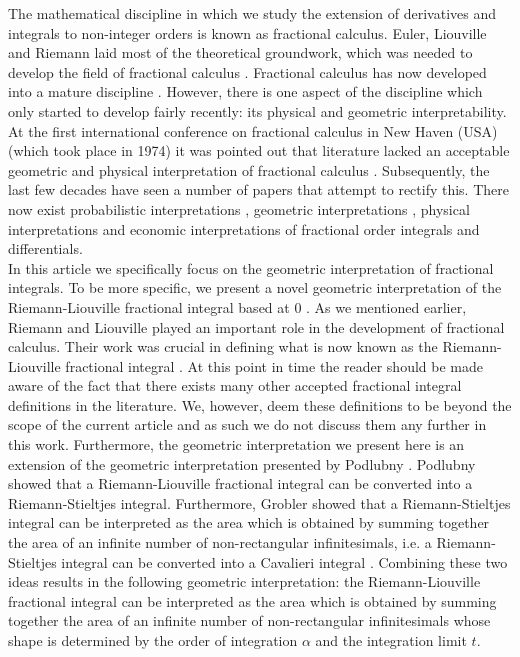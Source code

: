 \documentclass{article}
\theoremstyle{theorem}
\theoremstyle{definition}
\begin{document}
\noindent
The mathematical discipline in which we study the extension of derivatives and integrals to non-integer orders is known as fractional calculus. Euler, Liouville and Riemann laid most 
of the theoretical groundwork, which was needed to develop the field of fractional calculus \cite{davis59,euler1738,liouville1832,riemann1876,laurent1884}. Fractional calculus has now developed into a mature discipline \cite{machado14,machado17}. 
However, there is one aspect of the discipline which only started to develop fairly recently: its physical and geometric interpretability. At the first international conference on fractional calculus in
New Haven (USA) (which took place in 1974) it was pointed out that literature lacked an acceptable geometric and physical interpretation of fractional calculus \cite{ross06}. Subsequently, the last few decades have seen 
a number of papers that attempt to rectify this. There now exist probabilistic interpretations \cite{stanislavsky04,machado03}, geometric interpretations \cite{adda97,tarasov16,podlubny02}, physical interpretations \cite{cioc16,rutman95, nigmatullin92, gomez14} and economic 
interpretations \cite{tarasova17} of fractional order integrals and differentials.\\

\noindent
In this article we specifically focus on the geometric interpretation of fractional integrals. To be more specific, we present a novel geometric interpretation of the Riemann-Liouville fractional integral based at 0 \cite{laurent1884}.
As we mentioned earlier, Riemann and Liouville played an important role in the development of fractional calculus. Their work was crucial in defining what is now known as 
the Riemann-Liouville fractional integral \cite{laurent1884}. At this point in time the reader should be made aware of the fact that there exists many other accepted fractional integral definitions in the literature.
We, however, deem these definitions to be beyond the scope of the current article and as such we do not discuss them any further in this work. Furthermore, the geometric interpretation 
we present here is an extension of the geometric interpretation presented by Podlubny \cite{podlubny02}. Podlubny showed that a Riemann-Liouville fractional integral 
can be converted into a Riemann-Stieltjes integral. Furthermore, Grobler showed that a Riemann-Stieltjes integral can be interpreted as the area which is obtained by summing together 
the area of an infinite number of non-rectangular infinitesimals, i.e. a Riemann-Stieltjes integral can be converted into a Cavalieri integral \cite{ackermann12,grobler19}. Combining these two ideas results in the following geometric 
interpretation: the Riemann-Liouville fractional integral can be interpreted as the area which is obtained by summing together the area of an infinite number of non-rectangular infinitesimals whose shape is determined by the order of integration $\alpha$ and the integration limit $t$.\\
\end{document}
